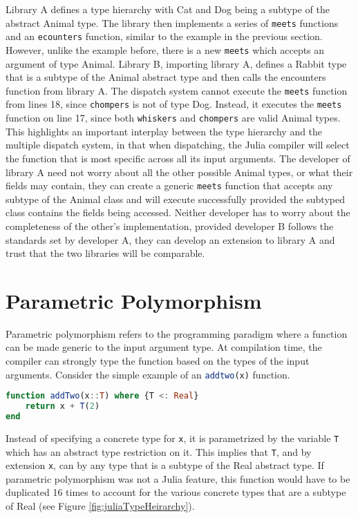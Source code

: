 Library A defines a type hierarchy with Cat and Dog being a subtype of the abstract Animal type. The library then
implements a series of \lstinline[language=Julia]{meets} functions and an \lstinline[language=Julia]{ecounters}
function, similar to the example in the previous section. However, unlike the example before, there is a new
\lstinline[language=Julia]{meets} which accepts an argument of type Animal. Library B, importing library A, defines a
Rabbit type that is a subtype of the Animal abstract type and then calls the encounters function from library A. The
dispatch system cannot execute the \lstinline[language=Julia]{meets} function from lines 18, since
\lstinline[language=Julia]{chompers} is not of type Dog. Instead, it executes the \lstinline[language=Julia]{meets}
function on line 17, since both \lstinline[language=Julia]{whiskers} and \lstinline[language=Julia]{chompers} are valid
Animal types. This highlights an important interplay between the type hierarchy and the multiple dispatch system, in
that when dispatching, the Julia compiler will select the function that is most specific across all its input arguments.
The developer of library A need not worry about all the other possible Animal types, or what their fields may contain,
they can create a generic \lstinline[language=Julia]{meets} function that accepts any subtype of the Animal class and
will execute successfully provided the subtyped class contains the fields being accessed. Neither developer has to worry
about the completeness of the other's implementation, provided developer B follows the standards set by developer A,
they can develop an extension to library A and trust that the two libraries will be comparable.

\section{Parametric Polymorphism}
Parametric polymorphism refers to the programming paradigm where a function can be made generic to the input argument
type. At compilation time, the compiler can strongly type the function based on the types of the input arguments.
Consider the simple example of an \lstinline[language=Julia]{addtwo(x)} function.
\begin{lstlisting}[language=Julia]
function addTwo(x::T) where {T <: Real}
    return x + T(2)
end
\end{lstlisting}
Instead of specifying a concrete type for \lstinline[language=Julia]{x}, it is parametrized by the variable
\lstinline[language=Julia]{T} which has an abstract type restriction on it. This implies that
\lstinline[language=Julia]{T}, and by extension \lstinline[language=Julia]{x}, can by any type that is a subtype of the
Real abstract type. If parametric polymorphism was not a Julia feature, this function would have to be duplicated 16
times to account for the various concrete types that are a subtype of Real (see Figure \ref{fig:juliaTypeHeirarchy}).

